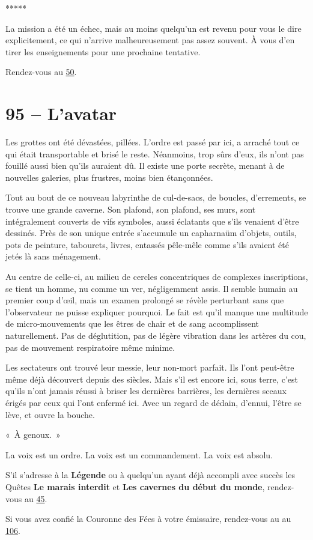 \documentclass{report}
\newcommand{\gsection}[1]{
    \section{#1}
    \label{section-#1}
}
\newcommand{\glink}[1]{\hyperref[section-#1]{#1}}
\newcommand{\ellipse}{
    \begin{center}
        *****
    \end{center}
}
\newcommand{\hero}[1]{
    \textbf{#1}
}
\begin{document}
\ellipse

La mission a été un échec, mais au moins quelqu'un est revenu pour vous le dire explicitement, ce qui n'arrive malheureusement pas assez souvent. À vous d'en tirer les enseignements pour une prochaine tentative.

Rendez-vous au \glink{50}.

\gsection{95 – L'avatar}

Les grottes ont été dévastées, pillées. L'ordre est passé par ici, a arraché tout ce qui était transportable et brisé le reste. Néanmoins, trop sûrs d'eux, ils n'ont pas fouillé aussi bien qu'ils auraient dû. Il existe une porte secrète, menant à de nouvelles galeries, plus frustres, moins bien étançonnées.

Tout au bout de ce nouveau labyrinthe de cul-de-sacs, de boucles, d'errements, se trouve une grande caverne. Son plafond, son plafond, ses murs, sont intégralement couverts de vifs symboles, aussi éclatants que s'ils venaient d'être dessinés. Près de son unique entrée s'accumule un capharnaüm d'objets, outils, pots de peinture, tabourets, livres, entassés pêle-mêle comme s'ils avaient été jetés là sans ménagement.

Au centre de celle-ci, au milieu de cercles concentriques de complexes inscriptions, se tient un homme, nu comme un ver, négligemment assis. Il semble humain au premier coup d’œil, mais un examen prolongé se révèle perturbant sans que l'observateur ne puisse expliquer pourquoi. Le fait est qu'il manque une multitude de micro-mouvements que les êtres de chair et de sang accomplissent naturellement. Pas de déglutition, pas de légère vibration dans les artères du cou, pas de mouvement respiratoire même minime.

Les sectateurs ont trouvé leur messie, leur non-mort parfait. Ils l'ont peut-être même déjà découvert depuis des siècles. Mais s'il est encore ici, sous terre, c'est qu'ils n'ont jamais réussi à briser les dernières barrières, les dernières sceaux érigés par ceux qui l'ont enfermé ici.
Avec un regard de dédain, d'ennui, l'être se lève, et ouvre la bouche.

« À genoux. »

La voix est un ordre. La voix est un commandement. La voix est absolu.

S'il s'adresse à la \hero{Légende} ou à quelqu'un ayant déjà accompli avec succès les Quêtes \textbf{Le marais interdit} et \textbf{Les cavernes du début du monde}, rendez-vous au \glink{45}.

Si vous avez confié la Couronne des Fées à votre émissaire, rendez-vous au au \glink{106}.
\end{document}

